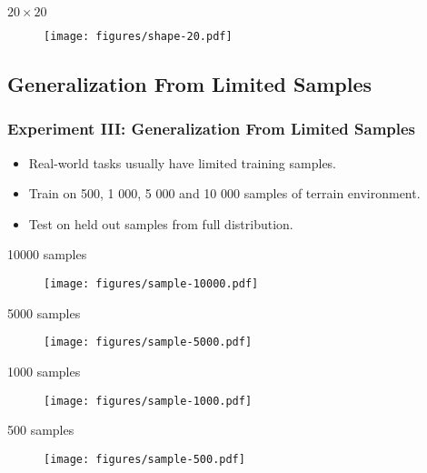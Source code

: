 \begin{frame}
    \begin{center}
        \(20 \times 20\)
        \begin{figure}
            \texttt{[image: figures/shape-20.pdf]}
        \end{figure}
    \end{center}
\end{frame}

\subsection{Generalization From Limited Samples}

\begin{frame}
    \frametitle{Experiment III: Generalization From Limited Samples}

    \begin{itemize}
        \item Real-world tasks usually have limited training samples.
        \item Train on 500, 1 000, 5 000 and 10 000 samples of terrain environment.
        \item Test on held out samples from full distribution.
    \end{itemize}
\end{frame}

\begin{frame}
    \begin{center}
        10000 samples
        \begin{figure}
            \texttt{[image: figures/sample-10000.pdf]}
        \end{figure}
    \end{center}
\end{frame}

\begin{frame}
    \begin{center}
        5000 samples
        \begin{figure}
            \texttt{[image: figures/sample-5000.pdf]}
        \end{figure}
    \end{center}
\end{frame}

\begin{frame}
    \begin{center}
        1000 samples
        \begin{figure}
            \texttt{[image: figures/sample-1000.pdf]}
        \end{figure}
    \end{center}
\end{frame}

\begin{frame}
    \begin{center}
        500 samples
        \begin{figure}
            \texttt{[image: figures/sample-500.pdf]}
        \end{figure}
    \end{center}
\end{frame}
